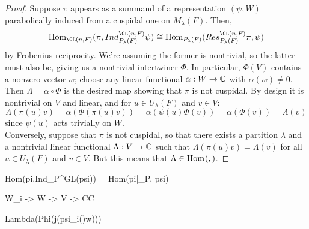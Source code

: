 \begin{proof}
	Suppose $\pi$ appears as a summand of a representation $(\psi,W)$ parabolically induced from a cuspidal one on $M_\lambda(F)$. Then,
	\[ \Hom_{\GL(n,F)}(\pi,Ind_{P_\lambda(F)}^{\GL(n,F)}\psi) \cong \Hom_{P_\lambda(F)}(Res_{P_\lambda(F)}^{\GL(n,F)}\pi,\psi) \]
	by Frobenius reciprocity. We're assuming the former is nontrivial, so the latter must also be, giving us a nontrivial intertwiner $\Phi$. In particular, $\Phi(V)$ contains a nonzero vector $w$; choose any linear functional $\alpha : W \to \mathbb{C}$ with $\alpha(w) \neq 0$. Then $\Lambda = \alpha \circ \Phi$ is the desired map showing that $\pi$ is not cuspidal. By design it is nontrivial on $V$ and linear, and for $u \in U_\lambda(F)$ and $v \in V$:
	\[ \Lambda(\pi(u)v) = \alpha(\Phi(\pi(u)v)) = \alpha(\psi(u)\Phi(v)) = \alpha(\Phi(v)) = \Lambda(v) \]
	since $\psi(u)$ acts trivially on $W$. \\
	
	Conversely, suppose that $\pi$ is not cuspidal, so that there exists a partition $\lambda$ and a nontrivial linear functional $\Lambda : V \to \mathbb{C}$ such that $\Lambda(\pi(u)v) = \Lambda(v)$ for all $u \in U_\lambda(F)$ and $v \in V$. But this means that $\Lambda \in \operatorname{Hom}_{}(,)$.
\end{proof}



Hom(pi,Ind_P^GL(psi)) = Hom(pi|_P, psi)


W_i -> W -> V -> CC

Lambda(Phi(j(psi_i()w)))